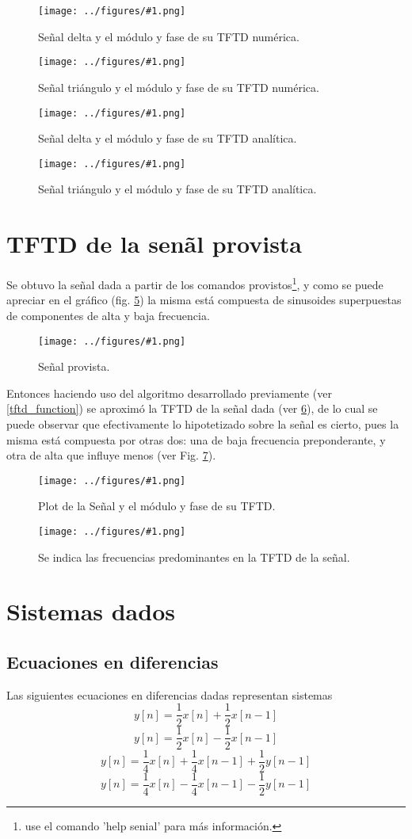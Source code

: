 \documentclass[letterpaper, 10 pt, conference]{ieeeconf}  %
\newcommand{\image}[2] {
  \begin{figure}[H]
    \centering
    \texttt{[image: ../figures/\#1.png]}
    \caption{#2}
    \label{fig:#1}
  \end{figure}
}
\begin{document}
\image{delta_tftd}{Se\~{n}al delta y el m\'odulo y fase de su TFTD num\'erica.}
\image{triangulo_tftd}{Se\~{n}al tri\'angulo y el m\'odulo y fase de su TFTD num\'erica.}
\image{delta_tftd_analitica}{Se\~{n}al delta y el m\'odulo y fase de su TFTD anal\'itica.}
\image{triangulo_tftd_analitica}{Se\~{n}al tri\'angulo y el m\'odulo y fase de su TFTD anal\'itica.}


\section{TFTD de la sen\~al provista}

Se obtuvo la se\~nal dada a partir de los comandos provistos\footnote{use el comando 'help senial' para m\'as informaci\'on.}, y como se puede apreciar en el gr\'afico (fig. \ref{fig:senial}) la misma est\'a compuesta de sinusoides superpuestas de componentes de alta y baja frecuencia.
\image{senial}{Se\~nal provista.}

Entonces haciendo uso del algoritmo desarrollado previamente (ver \ref{tftd_function}) se aproxim\'o la TFTD de la se\~{n}al dada (ver \ref{fig:senial_y_su_tftd}), de lo cual se puede observar que efectivamente lo hipotetizado sobre la se\~{n}al es cierto, pues la misma est\'a compuesta por otras dos: una de baja frecuencia preponderante, y otra de alta que influye menos (ver Fig. \ref{fig:tftd_senial_freqs}).
\image{senial_y_su_tftd}{Plot de la Se\~{n}al y el m\'odulo y fase de su TFTD.}
\image{tftd_senial_freqs}{Se indica las frecuencias predominantes en la TFTD de la se\~nal.}

\section{Sistemas dados}
\subsection{Ecuaciones en diferencias}
Las siguientes ecuaciones en diferencias dadas representan sistemas
\begin{equation} \label{eq1}
y[n] = \frac{1}{2}x[n] + \frac{1}{2}x[n-1]
\end{equation}
\begin{equation} \label{eq2}
y[n] = \frac{1}{2}x[n] - \frac{1}{2}x[n-1]
\end{equation}
\begin{equation} \label{eq3}
y[n] = \frac{1}{4}x[n] + \frac{1}{4}x[n-1] + \frac{1}{2}y[n-1]
\end{equation}
\begin{equation} \label{eq4}
y[n] = \frac{1}{4}x[n] - \frac{1}{4}x[n-1] - \frac{1}{2}y[n-1]
\end{equation}
\end{document}
